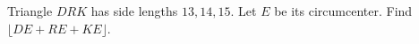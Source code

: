 Triangle $DRK$ has side lengths $13,14,15$. Let $E$ be its circumcenter. Find $\lfloor DE+RE+KE\rfloor$.
